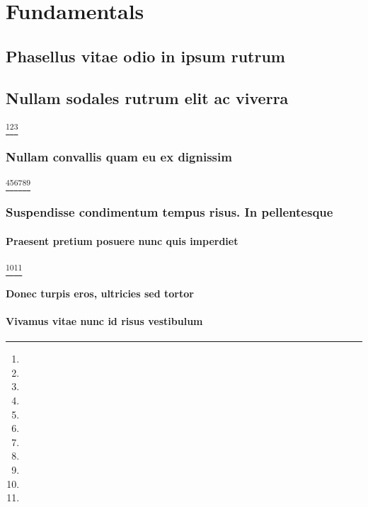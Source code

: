 \documentclass[%
  english,%
]{doctorate}
\begin{document}
\chapter{Fundamentals}

\lipsum[1-8]

\section{Phasellus vitae odio in ipsum rutrum}

\lipsum[1-8]

\section{Nullam sodales rutrum elit ac viverra}

\lipsum[1-8]\footnote{\lipsum[1]}\footnote{\lipsum[1]}\footnote{\lipsum[1]}

\subsection{Nullam convallis quam eu ex dignissim}

\lipsum[1-8]\footnote{\lipsum[1]}\footnote{\lipsum[1]}\footnote{\lipsum[1]}\footnote{\lipsum[1]}\footnote{\lipsum[1]}\footnote{\lipsum[1]}

\subsection{Suspendisse condimentum tempus risus. In pellentesque}

\lipsum[1-8]

\subsubsection{Praesent pretium posuere nunc quis imperdiet}

\lipsum[1-8]\footnote{\lipsum[1]}\footnote{\lipsum[1]}

\subsubsection{Donec turpis eros, ultricies sed tortor}

\lipsum[1-8]

\subsubsection{Vivamus vitae nunc id risus vestibulum}
\end{document}
